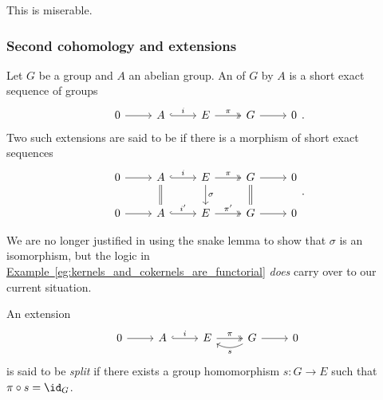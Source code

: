 \documentclass[main.tex]{subfiles}
\begin{document}
This is miserable.

\subsubsection{Second cohomology and extensions}
\label{sss:second_cohomology_and_extensions}

\begin{definition}
  \label{def:extension_of_a_group}
  Let $G$ be a group and $A$ an abelian group. An  of $G$ by $A$ is a short exact sequence of groups
  \begin{equation*}
    \begin{tikzcd}
      0
      \arrow[r]
      & A
      \arrow[r, hook, "i"]
      & E
      \arrow[r, two heads, "\pi"]
      & G
      \arrow[r]
      & 0
    \end{tikzcd}.
  \end{equation*}
  Two such extensions are said to be  if there is a morphism of short exact sequences
  \begin{equation*}
    \begin{tikzcd}
      0
      \arrow[r]
      & A
      \arrow[r, hook, "i"]
      \arrow[d, equals]
      & E
      \arrow[r, two heads, "\pi"]
      \arrow[d, "\sigma"]
      & G
      \arrow[r]
      \arrow[d, equals]
      & 0
      \\
      0
      \arrow[r]
      & A
      \arrow[r, hook, "i'"]
      & E
      \arrow[r, two heads, "\pi'"]
      & G
      \arrow[r]
      & 0
    \end{tikzcd}.
  \end{equation*}
\end{definition}

We are no longer justified in using the snake lemma to show that $\sigma$ is an isomorphism, but the logic in \hyperref[eg:kernels_and_cokernels_are_functorial]{Example~\ref*{eg:kernels_and_cokernels_are_functorial}} \emph{does} carry over to our current situation.

\begin{definition}
  \label{def:split_extension}
  An extension
  \begin{equation*}
    \begin{tikzcd}
      0
      \arrow[r]
      & A
      \arrow[r, hook, "i"]
      & E
      \arrow[r, two heads, "\pi"]
      & G
      \arrow[r]
      \arrow[l, bend left, "s"]
      & 0
    \end{tikzcd}
  \end{equation*}
  is said to be \emph{split} if there exists a group homomorphism $s\colon G \to E$ such that $\pi \circ s = \id_{G}$.
\end{definition}
\end{document}
